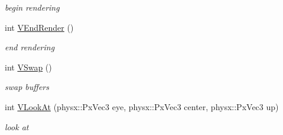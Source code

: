 \begin{DoxyCompactItemize}
\begin{DoxyCompactList}\small\item\em begin rendering \item\end{DoxyCompactList}\item 
\hypertarget{classPlatform_1_1RenderGLX_a603a3be28d270bbac50b15a0b0ba1c72}{
int \hyperlink{classPlatform_1_1RenderGLX_a603a3be28d270bbac50b15a0b0ba1c72}{VEndRender} ()}
\label{classPlatform_1_1RenderGLX_a603a3be28d270bbac50b15a0b0ba1c72}

\begin{DoxyCompactList}\small\item\em end rendering \item\end{DoxyCompactList}\item 
\hypertarget{classPlatform_1_1RenderGLX_a29609a5766cbbbb2b8b0184f4065c54e}{
int \hyperlink{classPlatform_1_1RenderGLX_a29609a5766cbbbb2b8b0184f4065c54e}{VSwap} ()}
\label{classPlatform_1_1RenderGLX_a29609a5766cbbbb2b8b0184f4065c54e}

\begin{DoxyCompactList}\small\item\em swap buffers \item\end{DoxyCompactList}\item 
\hypertarget{classPlatform_1_1RenderGLX_a4413eb1a12017c735cac003b38cdf97f}{
int \hyperlink{classPlatform_1_1RenderGLX_a4413eb1a12017c735cac003b38cdf97f}{VLookAt} (physx::PxVec3 eye, physx::PxVec3 center, physx::PxVec3 up)}
\label{classPlatform_1_1RenderGLX_a4413eb1a12017c735cac003b38cdf97f}

\begin{DoxyCompactList}\small\item\em look at \item\end{DoxyCompactList}\end{DoxyCompactItemize}
